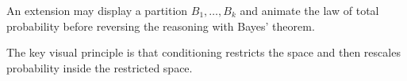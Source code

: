 An extension may display a partition \(B_1,\ldots,B_k\) and animate the law of total probability before reversing the reasoning with Bayes' theorem.

\begin{summarybox}
The key visual principle is that conditioning restricts the space and then rescales probability inside the restricted space.
\end{summarybox}
